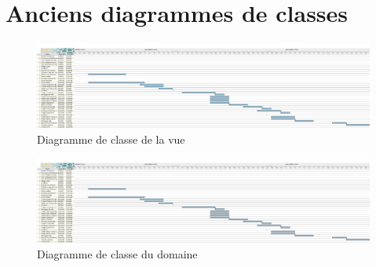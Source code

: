 %

\chapter{Anciens diagrammes de classes}
\label{s:old-class}

\begin{figure}[htpb]
    \centering
    \includegraphics[scale=0.20]{fig/echeancier.png}
    \caption{Diagramme de classe de la vue}
    \label{fig:old-view-class}
\end{figure}

\begin{figure}[htpb]
    \centering
    \includegraphics[scale=0.20]{fig/echeancier.png}
    \caption{Diagramme de classe du domaine}
    \label{fig:old-domain-class}
\end{figure}
